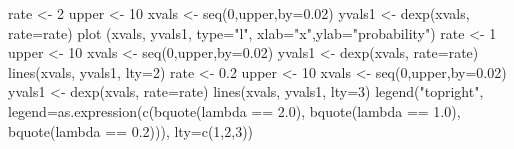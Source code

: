 \begin{Schunk}
\begin{Sinput}
 rate <- 2
 upper <- 10
 xvals <- seq(0,upper,by=0.02)
 yvals1 <- dexp(xvals, rate=rate)
 plot (xvals, yvals1, type="l", xlab="x",ylab="probability")
 rate <- 1
 upper <- 10
 xvals <- seq(0,upper,by=0.02)
 yvals1 <- dexp(xvals, rate=rate)
 lines(xvals, yvals1, lty=2)
 rate <- 0.2
 upper <- 10
 xvals <- seq(0,upper,by=0.02)
 yvals1 <- dexp(xvals, rate=rate)
 lines(xvals, yvals1, lty=3)
 legend("topright", legend=as.expression(c(bquote(lambda == 2.0), bquote(lambda == 1.0),  bquote(lambda == 0.2))), lty=c(1,2,3))
\end{Sinput}
\end{Schunk}

